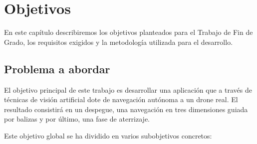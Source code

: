 \chapter{Objetivos}\label{cap.objetivos}
En este capítulo describiremos los objetivos planteados para el Trabajo de Fin de Grado, los requisitos exigidos y la metodología utilizada para el desarrollo.

\section{Problema a abordar}
\label{sec:objetivos}

El objetivo principal de este trabajo es desarrollar una aplicación que a través de técnicas de visión artificial dote de navegación autónoma a un drone real. El resultado consistirá en un despegue, una navegación en tres dimensiones guiada por balizas y por último, una fase de aterrizaje.

Este objetivo global se ha dividido en varios subobjetivos concretos:

